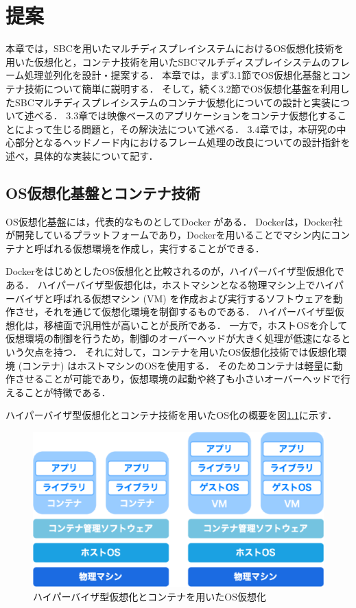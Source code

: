 \chapter{提案}
本章では，SBCを用いたマルチディスプレイシステムにおけるOS仮想化技術を用いた仮想化と，コンテナ技術を用いたSBCマルチディスプレイシステムのフレーム処理並列化を設計・提案する．
本章では，まず3.1節でOS仮想化基盤とコンテナ技術について簡単に説明する．
そして，続く3.2節でOS仮想化基盤を利用したSBCマルチディスプレイシステムのコンテナ仮想化についての設計と実装について述べる．
3.3章では映像ベースのアプリケーションをコンテナ仮想化することによって生じる問題と，その解決法について述べる．
3.4章では，本研究の中心部分となるヘッドノード内におけるフレーム処理の改良についての設計指針を述べ，具体的な実装について記す．

\section{OS仮想化基盤とコンテナ技術}
OS仮想化基盤には，代表的なものとしてDocker \cite{docker,using_docker}がある．
Dockerは，Docker社が開発しているプラットフォームであり，Dockerを用いることでマシン内にコンテナと呼ばれる仮想環境を作成し，実行することができる．

DockerをはじめとしたOS仮想化と比較されるのが，ハイパーバイザ型仮想化である．
ハイパーバイザ型仮想化は，ホストマシンとなる物理マシン上でハイパーバイザと呼ばれる仮想マシン (VM) を作成および実行するソフトウェアを動作させ，それを通じて仮想化環境を制御するものである．
ハイパーバイザ型仮想化は，移植面で汎用性が高いことが長所である．
一方で，ホストOSを介して仮想環境の制御を行うため，制御のオーバーヘッドが大きく処理が低速になるという欠点を持つ．
それに対して，コンテナを用いたOS仮想化技術では仮想化環境 (コンテナ) はホストマシンのOSを使用する．
そのためコンテナは軽量に動作させることが可能であり，仮想環境の起動や終了も小さいオーバーヘッドで行えることが特徴である．

ハイパーバイザ型仮想化とコンテナ技術を用いたOS化の概要を図\ref{docker}に示す．

\begin{figure}[H]
    \hspace*{\fill}
    \includegraphics[width=\linewidth]{./fig/chap3/docker.eps}
    \hspace*{\fill}
    \caption{ハイパーバイザ型仮想化とコンテナを用いたOS仮想化}
    \label{docker}
\end{figure}

